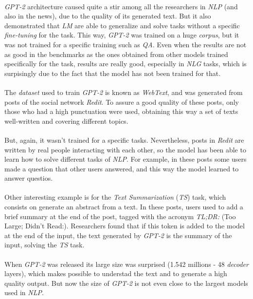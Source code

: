 \paragraph{}
\emph{GPT-2} architecture caused quite a stir among all the researchers in \emph{NLP} (and also in the news), due to the quality of its generated text. But it also demonstrated that \emph{LM} are able to generalize and solve tasks without a specific \emph{fine-tuning} for the task. This way, \emph{GPT-2} was trained on a huge \emph{corpus}, but it was not trained for a specific training such as \emph{QA}. Even when the results are not as good in the benchmarks as the ones obtained from other models trained specifically for the task, results are really good, especially in \emph{NLG} tasks, which is surpisingly due to the fact that the model has not been trained for that.
\paragraph{}
The \emph{dataset} used to train \emph{GPT-2} is known as \emph{WebText}, and was generated from posts of the social network \emph{Redit}. To assure a good quality of these posts, only those who had a high punctuation were used, obtaining this way a set of texts well-written and covering different topics.
\paragraph{}
But, again, it wasn't trained for a specific tasks. Nevertheless, posts in \emph{Redit} are written by real people interacting with each other, so the model has been able to learn how to solve different tasks of \emph{NLP}. For example, in these posts some users made a question that other users answered, and this way the model learned to answer questios. 
\paragraph{}
Other interesting example is for the \emph{Text Summarization} (\emph{TS}) task, which consists on generate an abstract from a text. In these posts, users used to add a brief summary at the end of the post, tagged with the acronym \emph{TL;DR:} (Too Large; Didn't Read:). Researchers found that if this token is added to the model at the end of the input, the text generated by \emph{GPT-2} is the summary of the input, solving the \emph{TS} task.
\paragraph{}
When \emph{GPT-2} was released its large size was surprised (1.542 millions - 48 \emph{decoder} layers), which makes possible to understad the text and to generate a high quality output. But now the size of \emph{GPT-2} is not even close to the largest models used in \emph{NLP}.
